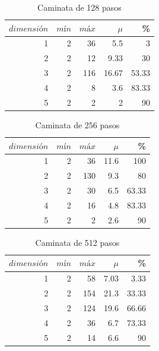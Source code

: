 \documentclass[12pt]{amsart}
\begin{document}
{\begin{table}[ht]
    \caption{Caminata de 128 pasos}
    \label{datos}
    \centering
    \begin{tabular}{|r|rrr|r|}
       \hline
        $dimensión$&$mín$&$máx$&$\mu$&\% \\
        \hline
        1 & 2 & 36 & 5.5 & 3 \\
        2 & 2 & 12 & 9.33 & 30 \\
        3 & 2 & 116 & 16.67 & 53.33 \\
        4 & 2 & 8 & 3.6 & 83.33 \\
        5 & 2 & 2 & 2 & 90\\
        \hline
    \end{tabular}
\end{table}
\bigskip

\begin{table}[ht]
    \caption{Caminata de 256 pasos}
    \label{datos}
    \centering
    \begin{tabular}{|r|rrr|r|}
       \hline
        $dimensión$&$mín$&$máx$&$\mu$&\% \\
        \hline
        1 & 2 & 36 & 11.6 & 100 \\
        2 & 2 & 130 & 9.3 & 80 \\
        3 & 2 & 30 & 6.5 & 63.33 \\
        4 & 2 & 16 & 4.8 & 83.33 \\
        5 & 2 & 2 & 2.6 & 90\\
        \hline
    \end{tabular}
\end{table}
\bigskip

\begin{table}[ht]
    \caption{Caminata de 512 pasos}
    \label{datos}
    \centering
    \begin{tabular}{|r|rrr|r|}
       \hline
        $dimensión$&$mín$&$máx$&$\mu$&\% \\
        \hline
        1 & 2 & 58 & 7.03 & 3.33 \\
        2 & 2 & 154 & 21.3 & 33.33 \\
        3 & 2 & 124 & 19.6 & 66.66 \\
        4 & 2 & 36 & 6.7 & 73.33 \\
        5 & 2 & 14 & 6.6 & 90\\
        \hline
    \end{tabular}
\end{table}
}
\\
\\
\end{document}
